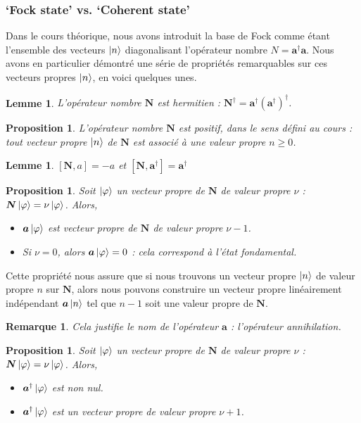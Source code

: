 \documentclass[11pt,oneside,a4paper]{article}
\newtheorem{lemma}[theorem]{Lemme}
\newtheorem{property}[theorem]{Proposition}
\newtheorem{remark}[theorem]{Remarque}
\begin{document}
\subsubsection{`Fock state' vs. `Coherent state'}\label{sec:fock vs. coherent}
Dans le cours théorique, nous avons introduit la base de Fock comme étant l'ensemble des vecteurs $\ket{n}$ diagonalisant l'opérateur nombre $N=\bm{a}^\dagger \bm{a}$. Nous avons en particulier démontré une série de propriétés remarquables sur ces vecteurs propres $\ket{n}$, en voici quelques unes.

\begin{lemma}
  L'opérateur nombre $\bm{N}$ est hermitien : $\bm{N}^\dagger = \bm{a}^\dagger \left(\bm{a}^\dagger\right)^\dagger$.
\end{lemma}

\begin{property}
  L'opérateur nombre $\bm{N}$ est positif, dans le sens défini au cours : tout vecteur propre $\ket{n}$ de $\bm{N}$ est associé à une valeur propre $n\geq 0$.
\end{property}
\begin{lemma}
  $[\bm{N},a]=-a$ et $[\bm{N},\bm{a}^\dagger] = \bm{a}^\dagger$
\end{lemma}
\begin{property}
  \label{Vp destruction}
  Soit $\ket{\varphi}$ un vecteur propre de $\bm{N}$ de valeur propre $\nu$ : $\bm{N}\ket{\varphi} = \nu\ket{\varphi}$. Alors,
  \begin{itemize}
      \item $\bm{a}\ket{\varphi}$ est vecteur propre de $\bm{N}$ de valeur propre $\nu-1$.
      \item Si $\nu = 0$, alors $\bm{a}\ket{\varphi} = 0$ : cela correspond à l'état fondamental.
  \end{itemize}
\end{property}
Cette propriété nous assure que si nous trouvons un vecteur propre $\ket{n}$ de valeur propre $n$ sur $\bm{N}$, alors nous pouvons construire un vecteur propre linéairement indépendant $\bm{a}\ket{n}$ tel que $n-1$ soit une valeur propre de $\bm{N}$.
\begin{remark}
  Cela justifie le nom de l'opérateur $\bm{a}$ : l'opérateur annihilation.
\end{remark}
\begin{property}
  Soit $\ket{\varphi}$ un vecteur propre de $\bm{N}$ de valeur propre $\nu$ : $\bm{N}\ket{\varphi} = \nu\ket{\varphi}$. Alors,
  \begin{itemize}
      \item $\bm{a}^\dagger\ket{\varphi}$ est non nul.
      \item $\bm{a}^\dagger\ket{\varphi}$ est un vecteur propre de valeur propre $\nu+1$.
  \end{itemize}
\end{property}
\end{document}
